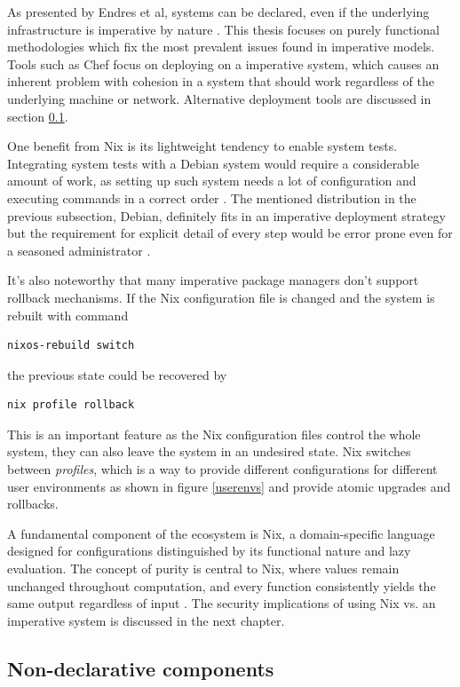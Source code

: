 As presented by Endres et al, systems can be declared, even if the
underlying infrastructure is imperative by nature
\cite{endres2017declarative}. This thesis focuses on purely functional
methodologies which fix the most prevalent issues found in
imperative models. Tools such as Chef focus on deploying on a
imperative system, which causes an inherent problem with cohesion in a
system that should work regardless of the underlying machine or
network. Alternative deployment tools are discussed in section
\ref{nondeclarative}.

One benefit from Nix is its lightweight tendency to enable system
tests. Integrating system tests with a Debian system would require a
considerable amount of work, as setting up such system needs a lot of
configuration and executing commands in a correct order
\cite{van2010automating}. The mentioned distribution in the
previous subsection, Debian, definitely fits in an imperative
deployment strategy but the requirement for explicit detail of every
step would be error prone even for a seasoned administrator
\cite{breitenbucher2017declarative}.

It's also noteworthy that many imperative package managers don't
support rollback mechanisms. If the Nix configuration file is changed
and the system is rebuilt with command
\begin{lstlisting}
nixos-rebuild switch
\end{lstlisting}
the previous state could be recovered by
\begin{lstlisting}
nix profile rollback
\end{lstlisting}
This is an important feature as the Nix configuration files control
the whole system, they can also leave the system in an undesired
state. Nix switches between \textit{profiles}, which is a way to
provide different configurations for different user environments as
shown in figure \ref{userenvs} and provide atomic upgrades and
rollbacks. \cite{nixosNixOSManual}

A fundamental component of the ecosystem is Nix, a domain-specific
language designed for configurations distinguished by its functional
nature and lazy evaluation. The concept of purity is central to Nix,
where values remain unchanged throughout computation, and every
function consistently yields the same output regardless of input
\cite{dolstra2013charon}. The security implications of using Nix
vs. an imperative system is discussed in the next chapter.

\subsection{Non-declarative components} \label{nondeclarative}

